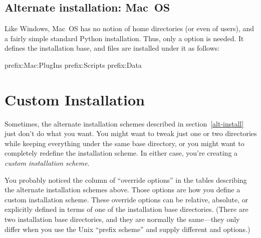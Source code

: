 \documentclass{howto}
\begin{document}
\subsection{Alternate installation: Mac~OS}
\label{alt-macos}

Like Windows, Mac~OS has no notion of home directories (or even of
users), and a fairly simple standard Python installation.  Thus, only a
 option is needed.  It defines the installation
base, and files are installed under it as follows:


              {prefix}{:Mac:PlugIns}
              {prefix}{:Scripts}
              {prefix}{:Data}



\section{Custom Installation}
\label{custom-install}

Sometimes, the alternate installation schemes described in
section~\ref{alt-install} just don't do what you want.  You might
want to tweak just one or two directories while keeping everything under
the same base directory, or you might want to completely redefine the
installation scheme.  In either case, you're creating a \emph{custom
  installation scheme}.

You probably noticed the column of ``override options'' in the tables
describing the alternate installation schemes above.  Those options are
how you define a custom installation scheme.  These override options can
be relative, absolute, or explicitly defined in terms of one of the
installation base directories.  (There are two installation base
directories, and they are normally the same---they only differ when you
use the Unix ``prefix scheme'' and supply different
 and  options.)
\end{document}

